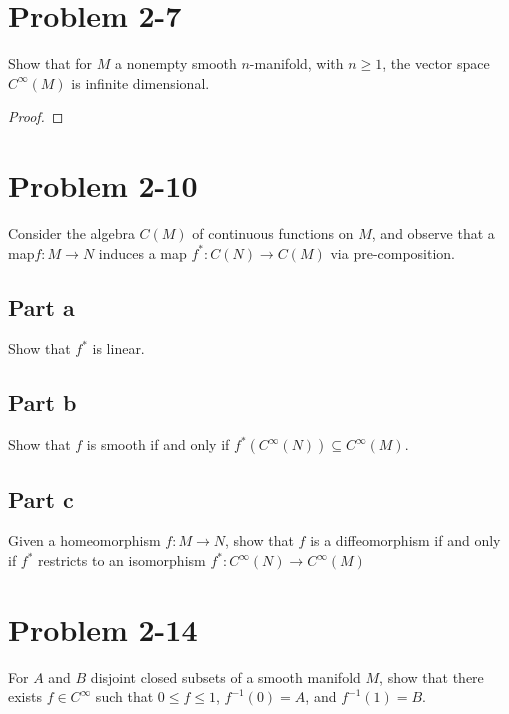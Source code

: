 \documentclass[fontsize=11pt]{scrartcl} %
\numberwithin{equation}{section} %
\numberwithin{figure}{section} %
\numberwithin{table}{section} %
\begin{document}
\section*{Problem 2-7}
Show that for $M$ a nonempty smooth $n$-manifold, with $n\geq 1$, the vector space $C^{\infty}(M)$
is infinite dimensional.
\\
\begin{proof}
\end{proof}
\section*{Problem 2-10}
Consider the algebra $C(M)$ of continuous functions on $M$, and observe that a map$f:M\to N$
induces a map $f^*:C(N)\to C(M)$ via pre-composition.
\subsection*{Part a}
Show that $f^*$ is linear.

\subsection*{Part b}
Show that $f$ is smooth if and only if $f^*(C^{\infty}(N))\subseteq C^{\infty}(M)$.

\subsection*{Part c}
Given a homeomorphism $f:M\to N$, show that $f$ is a diffeomorphism if and only if
$f^*$ restricts to an isomorphism $f^*:C^{\infty}(N)\to C^{\infty}(M)$
\section*{Problem 2-14}
For $A$ and $B$ disjoint closed subsets of a smooth manifold $M$, show that there
exists $f\in C^{\infty}$ such that $0\leq f\leq 1$, $f^{-1}(0) = A$, and $f^{-1}(1) = B$.
\end{document}
